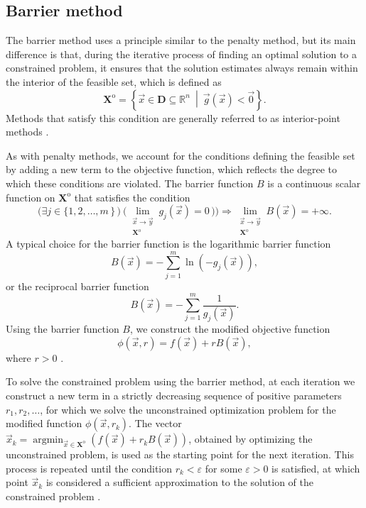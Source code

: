 \subsection{Barrier method}\label{barrier method}
The barrier method uses a principle similar to the penalty method, but its main difference is that, during the iterative process of finding an optimal solution to a constrained problem, it ensures that the solution estimates always remain within the interior of the feasible set, which is defined as
\begin{equation}
	\mathbf{X}^{\mathrm{o}} = \left\{ \vec{x} \in \mathbf{D} \subseteq \mathbb{R}^n \ \middle| \ \vec{g}(\vec{x}) < \vec{0} \right\}.
\end{equation}
Methods that satisfy this condition are generally referred to as interior-point methods \cite{non-linear-textbook}.

As with penalty methods, we account for the conditions defining the feasible set by adding a new term to the objective function, which reflects the degree to which these conditions are violated. The barrier function $ B $ is a continuous scalar function on $ \mathbf{X}^{\mathrm{o}} $ that satisfies the condition
\begin{equation}
	\Big( \exists j \in \{1,2,\dots,m \, \} \,\big) \ \big(\lim\limits_{\substack{\vec{x} \to \vec{y} \\ \mathbf{X}^{\mathrm{o}}}} g_j (\vec{x}) = 0 \, \big) \Big) \Rightarrow \lim\limits_{\substack{\vec{x} \to \vec{y} \\ \mathbf{X}^{\mathrm{o}}}} B (\vec{x}) = + \infty.
\end{equation}
A typical choice for the barrier function is the logarithmic barrier function
\begin{equation}\label{eq:log barrier function}
	B (\vec{x}) = -\sum_{j=1}^{m} \ln \left( - g_j (\vec{x}) \right),
\end{equation}
or the reciprocal barrier function
\begin{equation}\label{eq:reciprocal barrier function}
	B (\vec{x}) = -\sum_{j=1}^{m} \frac{1}{g_j (\vec{x})}.
\end{equation}
Using the barrier function $ B $, we construct the modified objective function
\begin{equation}\label{eq:cost function with barrier}
	\phi (\vec{x}, r) = f (\vec{x}) + r B(\vec{x}),
\end{equation}
where $ r > 0 $ \cite{non-linear-textbook}.

To solve the constrained problem using the barrier method, at each iteration we construct a new term in a strictly decreasing sequence of positive parameters $ r_1, r_2, \dots$, for which we solve the unconstrained optimization problem for the modified function $ \phi (\vec{x}, r_k)$. The vector $ \vec{x}_k  = \operatorname*{argmin}_{\vec{x} \in \mathbf{X}^\mathrm{o}} (f(\vec{x}) + r_k B(\vec{x})) $, obtained by optimizing the unconstrained problem, is used as the starting point for the next iteration. This process is repeated until the condition $ r_k < \varepsilon$ for some $ \varepsilon > 0$ is satisfied, at which point $ \vec{x}_k $ is considered a sufficient approximation to the solution of the constrained problem \cite{non-linear-textbook}.

